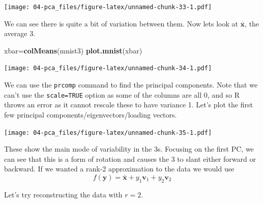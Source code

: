 \documentclass[]{book}
\newenvironment{Shaded}{\begin{snugshade}}{\end{snugshade}}
\newcommand{\DataTypeTok}[1]{\textcolor[rgb]{0.13,0.29,0.53}{#1}}
\newcommand{\DecValTok}[1]{\textcolor[rgb]{0.00,0.00,0.81}{#1}}
\newcommand{\KeywordTok}[1]{\textcolor[rgb]{0.13,0.29,0.53}{\textbf{#1}}}
\newcommand{\NormalTok}[1]{#1}
\newcommand{\OperatorTok}[1]{\textcolor[rgb]{0.81,0.36,0.00}{\textbf{#1}}}
\newcommand{\StringTok}[1]{\textcolor[rgb]{0.31,0.60,0.02}{#1}}
\theoremstyle{definition}
\theoremstyle{definition}
\theoremstyle{definition}
\theoremstyle{remark}
\begin{document}
\texttt{[image: 04-pca\_files/figure-latex/unnamed-chunk-33-1.pdf]}

We can see there is quite a bit of variation between them.
Now lets look at \(\bar{\mathbf x}\), the average 3.

\begin{Shaded}
\begin{Highlighting}[]
\NormalTok{xbar=}\KeywordTok{colMeans}\NormalTok{(mnist3)}
\KeywordTok{plot.mnist}\NormalTok{(xbar)}
\end{Highlighting}
\end{Shaded}

\texttt{[image: 04-pca\_files/figure-latex/unnamed-chunk-34-1.pdf]}

We can use the \texttt{prcomp} command to find the principal components. Note that we can't use the \texttt{scale=TRUE} option as some of the columns are all 0, and so R throws an error as it cannot rescale these to have variance 1. Let's plot the first few principal components/eigenvectors/loading vectors.

\begin{Shaded}
\end{Shaded}

\texttt{[image: 04-pca\_files/figure-latex/unnamed-chunk-35-1.pdf]}

These show the main mode of variability in the 3s. Focusing on the first PC, we can see that this is a form of rotation and causes the 3 to slant either forward or backward. If we wanted a rank-2 approximation to the data we would use
\[f(\mathbf y) = \bar{\mathbf x} + y_1 \mathbf v_1 + y_2 \mathbf v_2\]

Let's try reconstructing the data with \(r=2\).

\begin{Shaded}
\end{Shaded}
\end{document}

